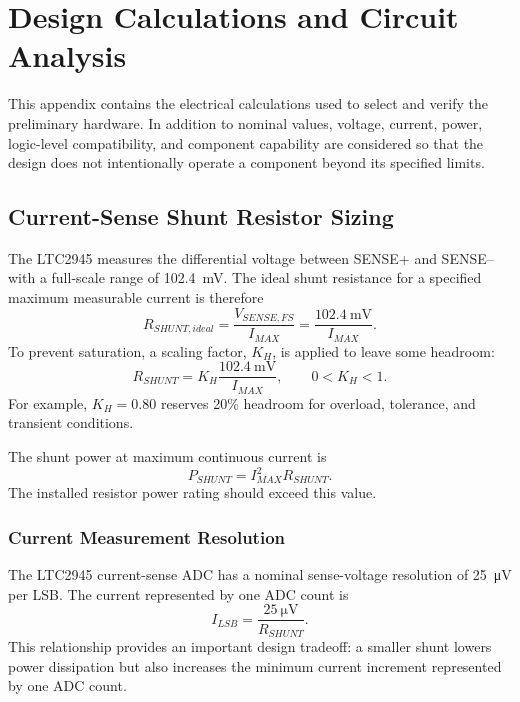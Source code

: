 \chapter{Design Calculations and Circuit Analysis}
\label{app:design-calculations}
This appendix contains the electrical calculations used to select and verify the
preliminary hardware. In addition to nominal values, voltage, current, power,
logic-level compatibility, and component capability are considered so that the
design does not intentionally operate a component beyond its specified limits.

\section{Current-Sense Shunt Resistor Sizing}
\label{sec:shunt-sizing}
The LTC2945 measures the differential voltage between SENSE+ and SENSE-- with a
full-scale range of \SI{102.4}{\milli\volt}. The ideal shunt resistance for a
specified maximum measurable current is therefore
\begin{equation}
    R_{SHUNT,ideal}=\frac{V_{SENSE,FS}}{I_{MAX}}
    =\frac{\SI{102.4}{\milli\volt}}{I_{MAX}}.
\end{equation}
To prevent saturation, a scaling factor, $K_H$, is applied to leave some headroom:
\begin{equation}
    R_{SHUNT}=K_H\frac{\SI{102.4}{\milli\volt}}{I_{MAX}},
    \qquad 0<K_H<1.
\end{equation}
For example, $K_H=0.80$ reserves 20\% headroom for overload, tolerance, and
transient conditions.

The shunt power at maximum continuous current is
\begin{equation}
    P_{SHUNT}=I_{MAX}^{2}R_{SHUNT}.
\end{equation}
The installed resistor power rating should exceed this value.

\subsection{Current Measurement Resolution}
The LTC2945 current-sense ADC has a nominal sense-voltage resolution of
\SI{25}{\micro\volt} per LSB. The current represented by one ADC count is
\begin{equation}
    I_{LSB}=\frac{\SI{25}{\micro\volt}}{R_{SHUNT}}.
\end{equation}
This relationship provides an important design tradeoff: a smaller shunt lowers
power dissipation but also increases the minimum current increment represented by
one ADC count.

